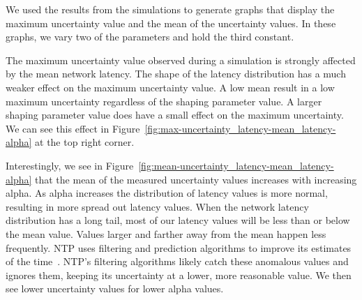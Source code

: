 

We used the results from the simulations to generate graphs that display the
maximum uncertainty value and the mean of the uncertainty values. In these
graphs, we vary two of the parameters and hold the third constant. 

The maximum uncertainty value observed during a simulation is strongly
affected by the mean network latency. The shape of the latency
distribution has a much weaker effect on the maximum uncertainty
value. A low mean result in a low maximum uncertainty regardless of
the shaping parameter value. A larger shaping parameter value does
have a small effect on the maximum uncertainty. We can see this effect
in Figure~\ref{fig:max-uncertainty_latency-mean_latency-alpha} at the
top right corner.

Interestingly, we see in Figure~\ref{fig:mean-uncertainty_latency-mean_latency-alpha} that the mean of the measured uncertainty values
increases with increasing alpha. As alpha increases the distribution of 
latency values is more normal, resulting in more spread out latency values.
When the network
latency distribution has a long tail, most of our latency values will be less
than or below the mean value. Values larger and farther away from the
mean happen less frequently. NTP uses
filtering and prediction algorithms to improve its estimates of the
time~\citep{Burbank2010}. NTP's filtering algorithms likely catch
these anomalous values and ignores them, keeping its uncertainty at a
lower, more reasonable value. We then see lower uncertainty values for
lower alpha values.

